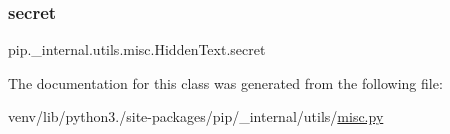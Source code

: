\mbox{\label{classpip_1_1__internal_1_1utils_1_1misc_1_1HiddenText_aebe8a214872322901f368347a4449603}} 
\subsubsection{\texorpdfstring{secret}{secret}}
{\footnotesize\ttfamily pip.\+\_\+internal.\+utils.\+misc.\+Hidden\+Text.\+secret}



The documentation for this class was generated from the following file\+:\begin{DoxyCompactItemize}
\item 
venv/lib/python3./site-\/packages/pip/\+\_\+internal/utils/\hyperlink{pip_2__internal_2utils_2misc_8py}{misc.\+py}\end{DoxyCompactItemize}

